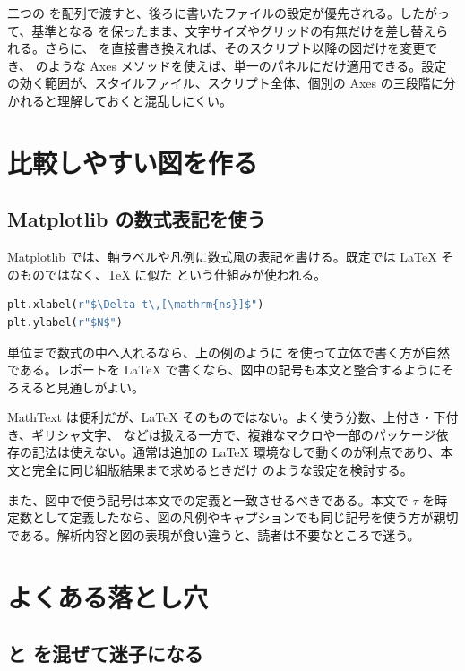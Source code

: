 二つの  を配列で渡すと、後ろに書いたファイルの設定が優先される。したがって、基準となる  を保ったまま、文字サイズやグリッドの有無だけを差し替えられる。さらに、 を直接書き換えれば、そのスクリプト以降の図だけを変更でき、 のような Axes メソッドを使えば、単一のパネルにだけ適用できる。設定の効く範囲が、スタイルファイル、スクリプト全体、個別の Axes の三段階に分かれると理解しておくと混乱しにくい。


\section{比較しやすい図を作る}

\subsection{Matplotlib の数式表記を使う}

Matplotlib では、軸ラベルや凡例に数式風の表記を書ける。既定では LaTeX そのものではなく、TeX に似た  という仕組みが使われる。

\begin{lstlisting}[language=Python]
plt.xlabel(r"$\Delta t\,[\mathrm{ns}]$")
plt.ylabel(r"$N$")
\end{lstlisting}

単位まで数式の中へ入れるなら、上の例のように \code{\\mathrm} を使って立体で書く方が自然である。レポートを LaTeX で書くなら、図中の記号も本文と整合するようにそろえると見通しがよい。

MathText は便利だが、LaTeX そのものではない。よく使う分数、上付き・下付き、ギリシャ文字、\code{\\mathrm} などは扱える一方で、複雑なマクロや一部のパッケージ依存の記法は使えない。通常は追加の LaTeX 環境なしで動くのが利点であり、本文と完全に同じ組版結果まで求めるときだけ  のような設定を検討する。

また、図中で使う記号は本文での定義と一致させるべきである。本文で $\tau$ を時定数として定義したなら、図の凡例やキャプションでも同じ記号を使う方が親切である。解析内容と図の表現が食い違うと、読者は不要なところで迷う。


\section{よくある落とし穴}

\subsection{ と  を混ぜて迷子になる}

